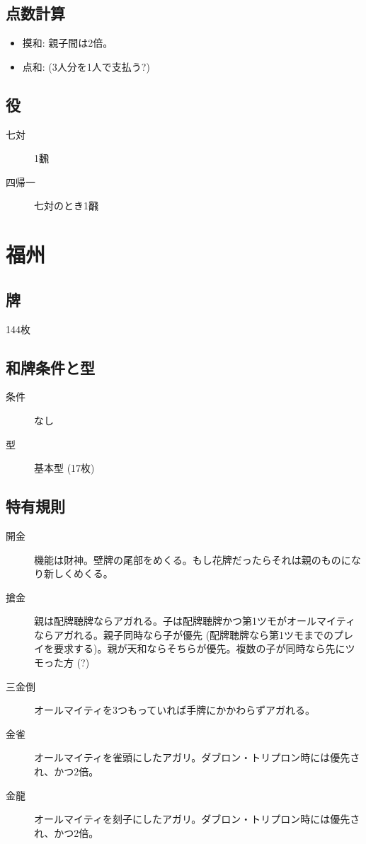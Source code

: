 \documentclass{ltjsarticle}
\begin{document}
\subsection{点数計算}
\begin{itemize}
    \item 摸和: 親子間は2倍。
    \item 点和: (3人分を1人で支払う?)
\end{itemize}
\subsection{役}
\begin{description}
    \item[七対] 1飜
    \item[四帰一] 七対のとき1飜
    \item[]
\end{description}
\section{福州}
\subsection{牌}144枚
\subsection{和牌条件と型}
\begin{description}
    \item[条件] なし
    \item[型] 基本型 (17枚)
\end{description}
\subsection{特有規則}
\begin{description}
    \item[開金] 機能は財神。壁牌の尾部をめくる。もし花牌だったらそれは親のものになり新しくめくる。
    \item[搶金] 親は配牌聴牌ならアガれる。子は配牌聴牌かつ第1ツモがオールマイティならアガれる。親子同時なら子が優先 (配牌聴牌なら第1ツモまでのプレイを要求する)。親が天和ならそちらが優先。複数の子が同時なら先にツモった方 (?)
    \item[三金倒] オールマイティを3つもっていれば手牌にかかわらずアガれる。
    \item[金雀] オールマイティを雀頭にしたアガリ。ダブロン・トリプロン時には優先され、かつ2倍。
    \item[金龍] オールマイティを刻子にしたアガリ。ダブロン・トリプロン時には優先され、かつ2倍。
\end{description}
\end{document}
